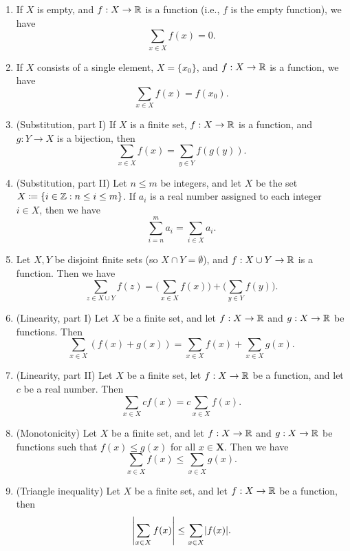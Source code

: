\begin{prop}\label{7.1.11}
  \mbox{}
  \begin{enumerate}
    \item If \(X\) is empty, and \(f : X \to \mathbb{R}\) is a function (i.e., \(f\) is the empty function), we have
          \[
            \sum_{x \in X} f(x) = 0.
          \]
    \item If \(X\) consists of a single element, \(X = \{x_0\}\), and \(f : X \to \mathbb{R}\) is a function, we have
          \[
            \sum_{x \in X} f(x) = f(x_0).
          \]
    \item (Substitution, part I) If \(X\) is a finite set, \(f : X \to \mathbb{R}\) is a function, and \(g : Y \to X\) is a bijection, then
          \[
            \sum_{x \in X} f(x) = \sum_{y \in Y} f(g(y)).
          \]
    \item (Substitution, part II) Let \(n \leq m\) be integers, and let \(X\) be the set \(X \coloneqq \{i \in \mathbb{Z} : n \leq i \leq m\}\).
          If \(a_i\) is a real number assigned to each integer \(i \in X\), then we have
          \[
            \sum_{i = n}^m a_i = \sum_{i \in X} a_i.
          \]
    \item Let \(X, Y\) be disjoint finite sets (so \(X \cap Y = \emptyset\)), and \(f : X \cup Y \to \mathbb{R}\) is a function.
          Then we have
          \[
            \sum_{z \in X \cup Y} f(z) = \Bigg(\sum_{x \in X} f(x)\Bigg) + \Bigg(\sum_{y \in Y} f(y)\Bigg).
          \]
    \item (Linearity, part I) Let \(X\) be a finite set, and let \(f : X \to \mathbb{R}\) and \(g : X \to \mathbb{R}\) be functions.
          Then
          \[
            \sum_{x \in X} (f(x) + g(x)) = \sum_{x \in X} f(x) + \sum_{x \in X} g(x).
          \]
    \item (Linearity, part II) Let \(X\) be a finite set, let \(f : X \to \mathbb{R}\) be a function, and let \(c\) be a real number.
          Then
          \[
            \sum_{x \in X} cf(x) = c \sum_{x \in X} f(x).
          \]
    \item (Monotonicity) Let \(X\) be a finite set, and let \(f : X \to \mathbb{R}\) and \(g : X \to \mathbb{R}\) be functions such that \(f(x) \leq g(x)\) for all \(x \in \mathbf{X}\).
          Then we have
          \[
            \sum_{x \in X} f(x) \leq \sum_{x \in X} g(x).
          \]
    \item (Triangle inequality) Let \(X\) be a finite set, and let \(f : X \to \mathbb{R}\) be a function, then
          \[
            \abs{\sum_{x \in X} f(x)} \leq \sum_{x \in X} \abs{f(x)}.
          \]
  \end{enumerate}
\end{prop}

